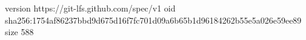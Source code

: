 version https://git-lfs.github.com/spec/v1
oid sha256:1754af86237bbd9d675d16f7fc701d09a6b65b1d96184262b55e5a026e59ee89
size 588
